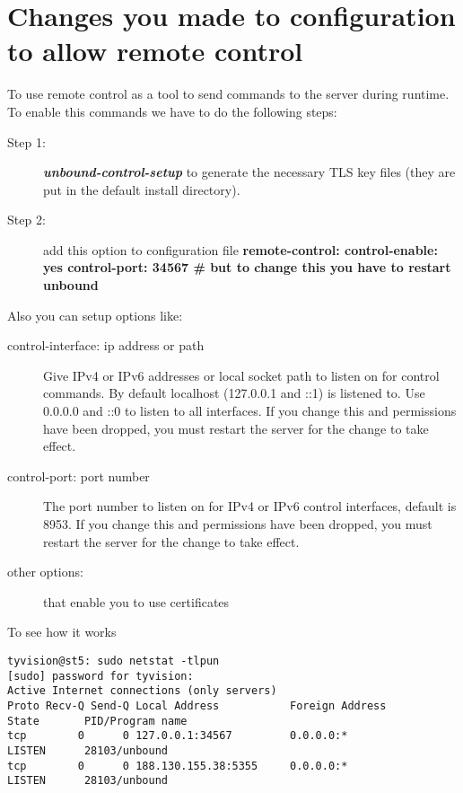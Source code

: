 \documentclass[a4paper]{article}
\newcommand\tab[1][1cm]{\hspace*{#1}}
\begin{document}
\section{Changes you made to configuration to allow remote control}

\tab To use remote control as a tool to send commands to the server during runtime. To enable this commands we have to do the following steps:
\begin{description}
	\item[Step 1:] \textbf{\textit{unbound-control-setup}} to generate the necessary TLS key files (they are put in the default install directory).
	\item[Step 2:] add this option to configuration file \textbf{\newline remote-control: \newline \tab control-enable: yes \newline \tab control-port: 34567   # but to change this you have to restart unbound}
\end{description}

Also you can setup options like:
\begin{description}
    \item[control-interface: ip address or path ] 
            Give IPv4 or IPv6 addresses or local socket path to listen on  for control  commands.   By  default  localhost (127.0.0.1 and ::1) is listened to. Use 0.0.0.0 and ::0 to listen to all interfaces. If you  change  this  and  permissions  have  been  dropped, you must restart the server for the change to take effect.
    \item[control-port: port number] The port number to listen on for IPv4 or IPv6 control interfaces, default is 8953. If you change this and permissions have been dropped, you must restart the server for the change to take effect.
    \item[other options:] that enable you to use certificates
\end{description}

To see how it works 
\begin{verbatim}
tyvision@st5: sudo netstat -tlpun
[sudo] password for tyvision: 
Active Internet connections (only servers)
Proto Recv-Q Send-Q Local Address           Foreign Address         State       PID/Program name
tcp        0      0 127.0.0.1:34567         0.0.0.0:*               LISTEN      28103/unbound   
tcp        0      0 188.130.155.38:5355     0.0.0.0:*               LISTEN      28103/unbound 
\end{verbatim}
\end{document}
